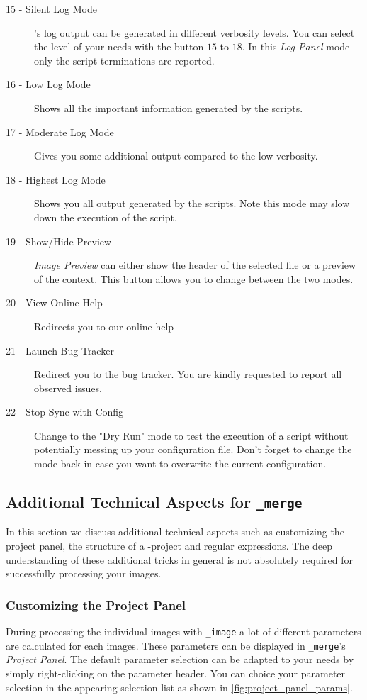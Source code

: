 \begin{description}
	\item[15 - Silent Log Mode] {\twodx}'s log output can be generated in different verbosity levels. You can select the level of your needs with the button $15$ to $18$. In this \textit{Log Panel} mode only the script terminations are reported.
	\item[16 - Low Log Mode] Shows all the important information generated by the scripts.
	\item[17 - Moderate Log Mode] Gives you some additional output compared to the low verbosity.
	\item[18 - Highest Log Mode] Shows you all output generated by the scripts. Note this mode may slow down the execution of the script.
	\item[19 - Show/Hide Preview] \textit{Image Preview} can either show the header of the selected file or a preview of the context. This button allows you to change between the two modes.
	\item[20 - View Online Help] Redirects you to our online help
	\item[21 - Launch Bug Tracker] Redirect you to the {\twodx} bug tracker. You are kindly requested to report all observed issues.
	\item[22 - Stop Sync with Config] Change to the "Dry Run" mode to test the execution of a script without potentially messing up your configuration file. Don't forget to change the mode back in case you want to overwrite the current configuration.
\end{description}



\subsection{Additional Technical Aspects for {\twodx}\texttt{\_merge}}
\label{sec:tech_details}
In this section we discuss additional technical aspects such as customizing the project panel, the structure of a {\twodx}-project and regular expressions. The deep understanding of these additional tricks in general is not absolutely required for successfully processing your images.

\subsubsection{Customizing the Project Panel}
\label{sec:project_panel}

During processing the individual images with {\twodx}\texttt{\_image} a lot of different parameters are calculated for each images. These parameters can be displayed in {\twodx}\texttt{\_merge}'s \textit{Project Panel}. The default parameter selection can be adapted to your needs by simply right-clicking on the parameter header. You can choice your parameter selection in the appearing selection list as shown in \autoref{fig:project_panel_params}.

